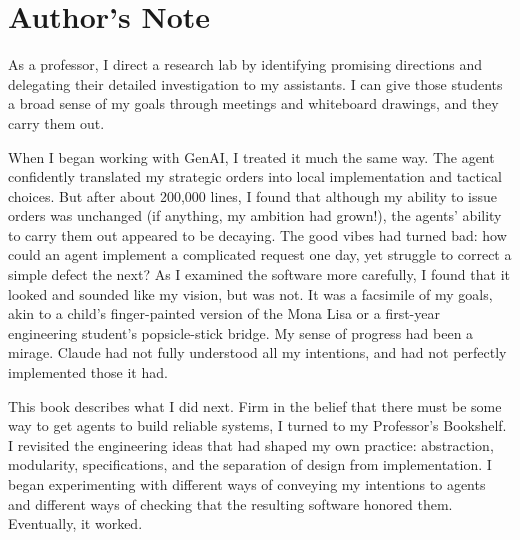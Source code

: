 



\chapter{Author’s Note}

As a professor, I direct a research lab by identifying promising directions and delegating their detailed investigation to my assistants. I can give those students a broad sense of my goals through meetings and whiteboard drawings, and they carry them out.

When I began working with GenAI, I treated it much the same way. The agent confidently translated my strategic orders into local implementation and tactical choices. But after about 200,000 lines, I found that although my ability to issue orders was unchanged (if anything, my ambition had grown!), the agents’ ability to carry them out appeared to be decaying. The good vibes had turned bad: how could an agent implement a complicated request one day, yet struggle to correct a simple defect the next? As I examined the software more carefully, I found that it looked and sounded like my vision, but was not. It was a facsimile of my goals, akin to a child’s finger-painted version of the Mona Lisa or a first-year engineering student’s popsicle-stick bridge. My sense of progress had been a mirage. Claude had not fully understood all my intentions, and had not perfectly implemented those it had.

This book describes what I did next. Firm in the belief that there must be some way to get agents to build reliable systems, I turned to my Professor’s Bookshelf. I revisited the engineering ideas that had shaped my own practice: abstraction, modularity, specifications, and the separation of design from implementation. I began experimenting with different ways of conveying my intentions to agents and different ways of checking that the resulting software honored them. Eventually, it worked.

